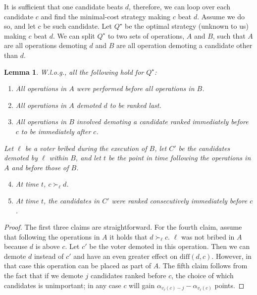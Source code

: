 \documentclass[letterpaper]{article} %
\newtheorem{lemma}{Lemma}
\newcommand{\diff}{\mathrm{diff}}
\begin{document}
It is sufficient that one candidate beats $d$, therefore, we can loop over each candidate $c$ and find the minimal-cost strategy making $c$ beat $d$.
Assume we do so, and let $c$ be such candidate. Let $Q^\star$ be the optimal strategy (unknown to us) making $c$ beat $d$. We can split $Q^\star$ to two sets of operations, $A$ and $B$, such that $A$ are all operations demoting $d$ and $B$ are all operation demoting a candidate other than $d$.

\begin{lemma}
W.l.o.g., all the following hold for $Q^\star$:
\begin{enumerate}
    \item All operations in $A$ were performed before all operations in $B$.
    \item All operations in $A$ demoted $d$ to be ranked last.
    \item All operations in $B$ involved demoting a candidate ranked immediately before $c$ to be immediately after $c$.
    \end{enumerate}
Let $\ell$ be a voter bribed during the execution of $B$, let $C'$ be the candidates demoted by $\ell$ within $B$, and let $t$ be the point in time following the operations in $A$ and before those of $B$.
    \begin{enumerate}
    \setcounter{enumi}{3}
    \item At time $t$, $c \succ_\ell d$.
    \item At time $t$, the candidates in $C'$ were ranked consecutively  immediately before $c$.
\end{enumerate}
\end{lemma}
\begin{proof}
The first three claims are straightforward.
For the fourth claim,
assume that following the operations in $A$ it holds that $d \succ_{\ell} c$. $\ell$ was not bribed in $A$ because $d$ is above $c$. Let $c'$ be the voter demoted in this operation. Then we can demote $d$ instead of $c'$ and have an even greater effect on $\diff(d, c)$. However, in that case this operation can be placed as part of $A$. The fifth claim follows from the fact that if we demote $j$ candidates ranked before $c$, the choice of which  candidates is unimportant; in any case $c$ will gain $\alpha_{v_\ell(c) - j} - \alpha_{v_\ell(c)}$ points.
\end{proof}

\end{document}
